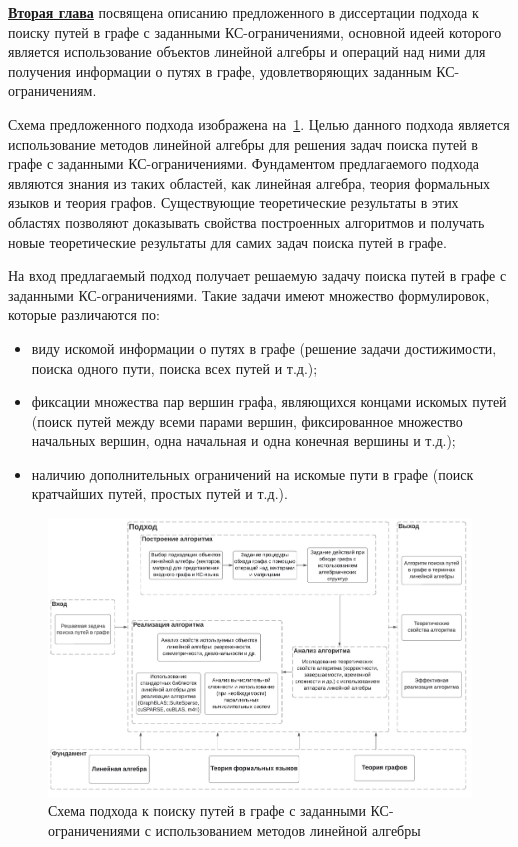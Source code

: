 \underline{\textbf{Вторая глава}} посвящена описанию предложенного в диссертации подхода к поиску путей в графе с заданными КС-ограничениями, основной идеей которого является использование объектов линейной алгебры и операций над ними для получения информации о путях в графе, удовлетворяющих заданным КС-ограничениям.

Схема предложенного подхода изображена на~\cref{fig:schema}. Целью данного подхода является использование методов линейной алгебры для решения задач поиска путей в графе с заданными КС-ограничениями. Фундаментом предлагаемого подхода являются знания из таких областей, как линейная алгебра, теория формальных языков и теория графов. Существующие теоретические результаты в этих областях позволяют доказывать свойства построенных алгоритмов и получать новые теоретические результаты для самих задач поиска путей в графе.

На вход предлагаемый подход получает решаемую задачу поиска путей в графе с заданными КС-ограничениями. Такие задачи имеют множество формулировок, которые различаются по:
\begin{itemize}
    \item виду искомой информации о путях в графе (решение задачи достижимости, поиска одного пути, поиска всех путей и т.д.);
    \item фиксации множества пар вершин графа, являющихся концами искомых путей (поиск путей между всеми парами вершин, фиксированное множество начальных вершин, одна начальная и одна конечная вершины и т.д.);
    \item наличию дополнительных ограничений на искомые пути в графе (поиск кратчайших путей, простых путей и т.д.).
\end{itemize}

\begin{figure}
	\includegraphics[width = 12cm]{Dissertation/images/schema.pdf}
	\caption{Схема подхода к поиску путей в графе с заданными КС-ограничениями с использованием методов линейной алгебры}
	\label{fig:schema}
\end{figure}

